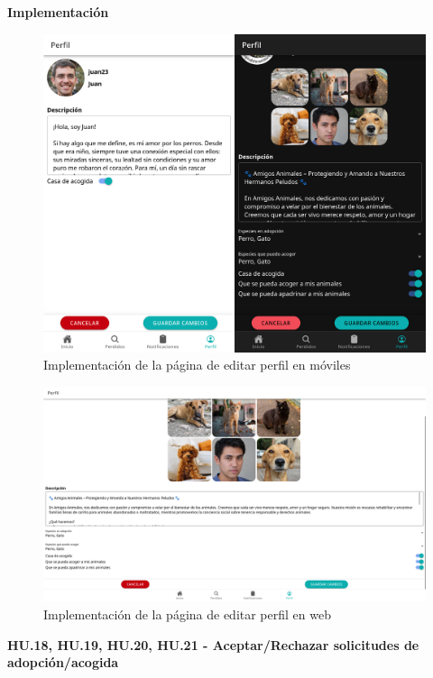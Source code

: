 \textbf{Implementación}


\begin{figure}[H]
	\centering
	\includegraphics[width=1\linewidth]{"sprint 4/hu17/implementacion"}
	\caption{Implementación de la página de editar perfil en móviles}
	\label{fig:implementacionEditarPerfil}
\end{figure}


\begin{figure}[H]
	\centering
	\includegraphics[width=1\linewidth]{"sprint 4/hu17/implementacionWeb"}
	\caption{Implementación de la página de editar perfil en web}
	\label{fig:implementacionEditarPerfilWeb}
\end{figure}


\Large{\textbf{HU.18, HU.19, HU.20, HU.21 - Aceptar/Rechazar solicitudes de adopción/acogida }} \\

